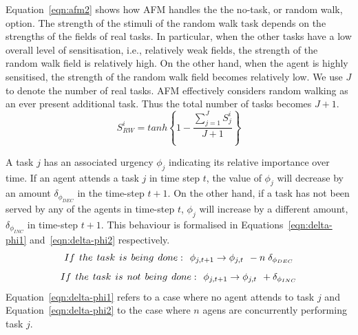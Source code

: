 \documentclass[smallcondensed]{svjour3}
\begin{document}
Equation~\ref{eqn:afm2} shows how AFM handles the the no-task, or random walk, option.  The strength of the stimuli of the random walk task depends on the strengths of the fields of real tasks.  In particular, when the other tasks have a low overall level of sensitisation, i.e., relatively weak fields, the strength of the random walk field is relatively high.  On the other hand, when the agent is highly sensitised, the strength of the random walk field becomes relatively low.  We use $J$ to denote the number of real tasks.  AFM effectively considers random walking as an ever present additional task.  Thus the total number of tasks becomes $J+1$. %
\begin{equation}
S^{i}_{RW} = tanh \left \{ 1 -  \frac{ \sum_{j=1}^{J} S^{i}_{j}}{J + 1} \right \}
\label{eqn:afm2}
\end{equation}

A task $j$ has an associated urgency $\phi_j$ indicating its relative importance over time.  If an agent attends a task $j$ in time step $t$, the value of $\phi_j$ will decrease by an amount $\delta_{\phi_{DEC}}$ in the time-step $t+1$.  On the other hand, if a task has not been served by any of the agents in time-step $t$, $\phi_j$ will increase by a different amount, $\delta_{\phi_{INC}}$ in time-step $t+1$.  This behaviour is formalised in Equations~\ref{eqn:delta-phi1} and~\ref{eqn:delta-phi2} respectively.
\begin{equation}
 If\hspace*{0.15cm}the \hspace*{0.15cm}task\hspace*{0.15cm}is\hspace*{0.15cm}being\hspace*{0.15cm}done:\hspace*{0.15cm}  \phi_{j,t+1} \rightarrow \phi_{j,t} \hspace*{0.15cm} - n\hspace*{0.10cm}\delta_{\phi_{DEC}}
\label{eqn:delta-phi2}
\end{equation}
\begin{equation}
 If\hspace*{0.15cm}the\hspace*{0.15cm} task\hspace*{0.15cm}is\hspace*{0.15cm}not\hspace*{0.15cm}being\hspace*{0.15cm} done:\hspace*{0.15cm} \phi_{j,t+1} \rightarrow \phi_{j,t} \hspace*{0.15cm} + \delta_{\phi_{INC}}
\label{eqn:delta-phi1}
\end{equation}
Equation~\ref{eqn:delta-phi1} refers to a case where no agent attends to task $j$ and Equation~\ref{eqn:delta-phi2} to the case where $n$ agens are concurrently performing task $j$.
\end{document}
